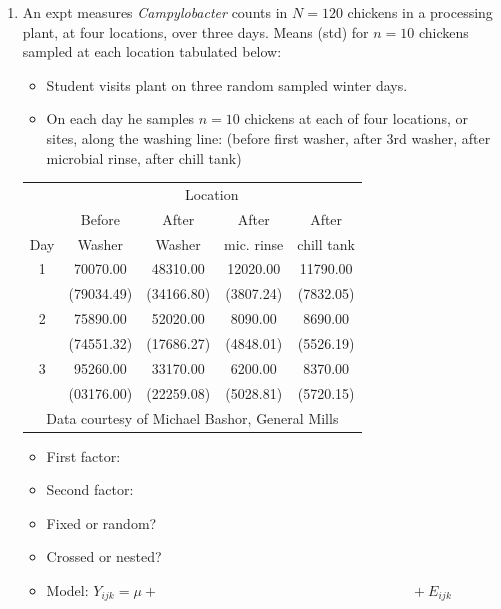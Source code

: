 \begin{enumerate}
\item An expt measures {\em Campylobacter} counts in $N=120$ chickens in a processing plant, at four locations, over three days.  Means (std) for $n=10$ chickens sampled at each location tabulated below:
\begin{itemize}
\item Student visits plant on three random sampled winter days.
\item On each day he samples $n=10$ chickens at each of four locations, or sites, along the washing line: (before first washer, after 3rd washer, after microbial rinse, after chill tank)
\end{itemize}
\begin{center}
\begin{large}
\begin{tabular}{c|cccc}
& \multicolumn{4}{c}{Location} \\
& Before & After & After & After \\
Day & Washer & Washer & mic. rinse & chill tank \\ \hline
 1       &       70070.00      &      48310.00      &      12020.00      &      11790.00 \\
         &      (79034.49)     &     (34166.80)     &      (3807.24)     &      (7832.05)\\
 2       &       75890.00      &      52020.00      &       8090.00      &       8690.00 \\
         &      (74551.32)     &     (17686.27)     &      (4848.01)     &      (5526.19) \\
 3       &       95260.00      &      33170.00      &       6200.00      &       8370.00 \\
         &      (03176.00)     &     (22259.08)     &      (5028.81)     &      (5720.15) \\ \hline
\multicolumn{5}{c}{Data courtesy of Michael Bashor, General Mills } \\
\end{tabular}
\end{large}
\end{center}

\begin{itemize}
\item First factor:
\item Second factor:
\item Fixed or random?
\item Crossed or nested?
\item Model:  
$Y_{ijk} = \mu + \hspace{3in} + E_{ijk}$
\end{itemize}


\end{enumerate}
